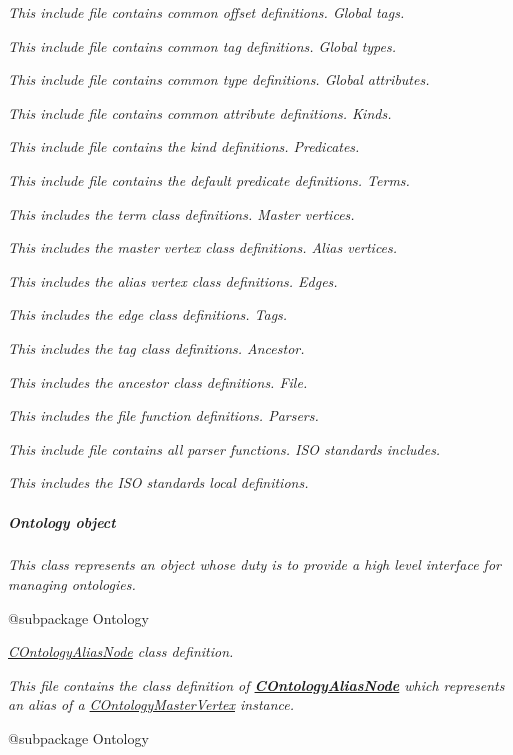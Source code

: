 {\itshape This include file contains common offset definitions. Global tags.}

{\itshape This include file contains common tag definitions. Global types.}

{\itshape This include file contains common type definitions. Global attributes.}

{\itshape This include file contains common attribute definitions. Kinds.}

{\itshape This include file contains the kind definitions. Predicates.}

{\itshape This include file contains the default predicate definitions. Terms.}

{\itshape This includes the term class definitions. Master vertices.}

{\itshape This includes the master vertex class definitions. Alias vertices.}

{\itshape This includes the alias vertex class definitions. Edges.}

{\itshape This includes the edge class definitions. Tags.}

{\itshape This includes the tag class definitions. Ancestor.}

{\itshape This includes the ancestor class definitions. File.}

{\itshape This includes the file function definitions. Parsers.}

{\itshape This include file contains all parser functions. I\-S\-O standards includes.}

{\itshape This includes the I\-S\-O standards local definitions. \subparagraph*{Ontology object}}

{\itshape }

{\itshape This class represents an object whose duty is to provide a high level interface for managing ontologies.}

{\itshape \begin{DoxyVerb} @subpackage        Ontology\end{DoxyVerb}
}

{\itshape {\itshape \hyperlink{class_c_ontology_alias_node}{C\-Ontology\-Alias\-Node}} class definition.}

{\itshape This file contains the class definition of {\bfseries \hyperlink{class_c_ontology_alias_node}{C\-Ontology\-Alias\-Node}} which represents an alias of a \hyperlink{class_c_ontology_master_vertex}{C\-Ontology\-Master\-Vertex} instance.}

{\itshape \begin{DoxyVerb} @subpackage        Ontology
\end{DoxyVerb}
}

